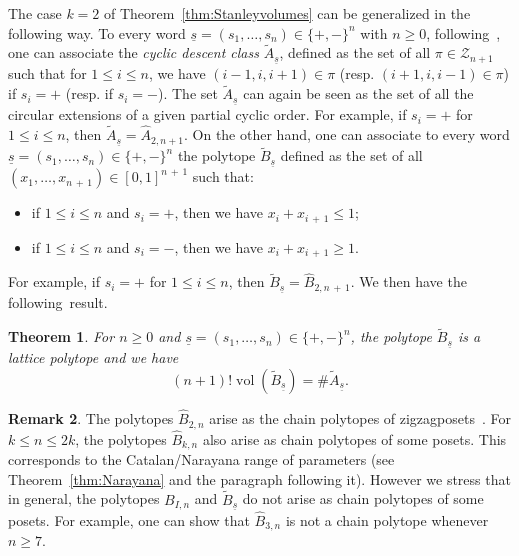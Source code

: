\documentclass[11pt]{article}
\newtheorem{theo}{Theorem}[section]
\theoremstyle{definition}
\newtheorem{rema}[theo]{Remark}
\numberwithin{equation}{section}
\numberwithin{figure}{section}
\numberwithin{table}{section}
\DeclareMathOperator{\vol}{vol}
\newcommand{\calZ}{\mathcal Z}
\begin{document}
The case $k=2$ of Theorem~\ref{thm:Stanleyvolumes} can be generalized in the following way. To every word $\underline{s}=(s_1,\ldots,s_n)\in \{+,-\}^n$ with $n\geq0$, following~\cite{R17}, one can associate the \emph{cyclic descent class} $\widetilde{A}_{\underline{s}}$, defined as the set of all $\pi\in\calZ_{n+1}$ such that for $1 \leq i\leq n$, we have $(i-1,i,i+1)\in \pi$ (resp. $(i+1,i,i-1)\in \pi$) if $s_i=+$ (resp. if $s_i=-$). The set $\widetilde{A}_{\underline{s}}$ can again be seen as the set of all the circular extensions of a given partial cyclic order. For example, if $s_i=+$ for $1 \leq i \leq n$, then $\widetilde{A}_{\underline{s}}=\hat{A}_{2,n+1}$. On the other hand, one can associate to every word $\underline{s}=(s_1,\ldots,s_n)\in\{+,-\}^n$ the polytope $\widetilde{B}_{\underline{s}}$ defined as the set of all $(x_1,\ldots,x_{n\,+\,1})\in[0,1]^{n\,+\,1}$ such that:
\begin{itemize}
\item if $1 \leq i \leq n$ and $s_i=+$, then we have $x_i+x_{i\,+\,1}\leq 1$;\label{list-rem-2.4.1}
\item if $1 \leq i \leq n$ and $s_i=-$, then we have $x_i+x_{i\,+\,1}\geq 1$.\label{list-rem-2.4.2}
\end{itemize}
For example, if $s_i=+$ for $1 \leq i \leq n$, then $\widetilde{B}_{\underline{s}}=\hat{B}_{2,n\,+\,1}$. We then have the following~result.

\begin{theo}\label{thm:cyclicdescents}
For $n\geq0$ and $\underline{s}=(s_1,\ldots,s_n)\in\{+,-\}^n$, the polytope $\widetilde{B}_{\underline{s}}$ is a lattice polytope and we have
\begin{equation}
(n+1)! \vol(\widetilde{B}_{\underline{s}}) = \# \widetilde{A}_{\underline{s}}.
\end{equation}
\end{theo}

\begin{rema}
The polytopes $\hat{B}_{2,n}$ arise as the chain polytopes of zigzag\linebreak posets~\cite{S86}. For $k \leq n \leq 2k$, the polytopes $\hat{B}_{k,n}$ also arise as chain polytopes of some posets. This corresponds to the Catalan/Narayana range of parameters (see Theorem~\ref{thm:Narayana} and the paragraph following it). However we stress that in general, the polytopes $B_{I,n}$ and $\widetilde{B}_{\underline{s}}$ do not arise as chain polytopes of some posets. For example, one can show that $\hat{B}_{3,n}$ is not a chain polytope whenever $n\geq7$.
\end{rema}
\end{document}

